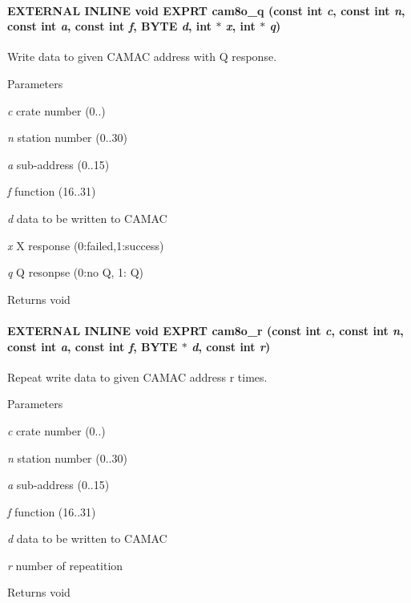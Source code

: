 \paragraph[{cam8o\_\-q}]{\setlength{\rightskip}{0pt plus 5cm}EXTERNAL INLINE void EXPRT cam8o\_\-q (const int {\em c}, \/  const int {\em n}, \/  const int {\em a}, \/  const int {\em f}, \/  {\bf BYTE} {\em d}, \/  int $\ast$ {\em x}, \/  int $\ast$ {\em q})}\hfill\label{group__mcstdfunctionh_gaec705d957dba655b2aa048237b36d0b3}
Write data to given CAMAC address with Q response. 
\begin{DoxyParams}{Parameters}
\item[{\em c}]crate number (0..) \item[{\em n}]station number (0..30) \item[{\em a}]sub-\/address (0..15) \item[{\em f}]function (16..31) \item[{\em d}]data to be written to CAMAC \item[{\em x}]X response (0:failed,1:success) \item[{\em q}]Q resonpse (0:no Q, 1: Q) \end{DoxyParams}
\begin{DoxyReturn}{Returns}
void 
\end{DoxyReturn}
\paragraph[{cam8o\_\-r}]{\setlength{\rightskip}{0pt plus 5cm}EXTERNAL INLINE void EXPRT cam8o\_\-r (const int {\em c}, \/  const int {\em n}, \/  const int {\em a}, \/  const int {\em f}, \/  {\bf BYTE} $\ast$ {\em d}, \/  const int {\em r})}\hfill\label{group__mcstdfunctionh_ga6a38e31772c0376e9a709cd42d6b94e7}
Repeat write data to given CAMAC address r times. 
\begin{DoxyParams}{Parameters}
\item[{\em c}]crate number (0..) \item[{\em n}]station number (0..30) \item[{\em a}]sub-\/address (0..15) \item[{\em f}]function (16..31) \item[{\em d}]data to be written to CAMAC \item[{\em r}]number of repeatition \end{DoxyParams}
\begin{DoxyReturn}{Returns}
void 
\end{DoxyReturn}
